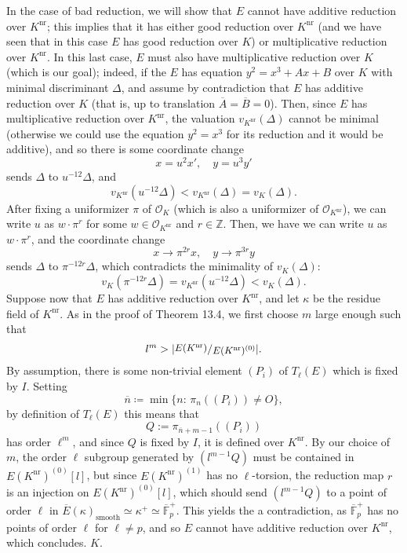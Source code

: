 \documentclass[a4paper]{article}
\newcommand{\Z}{\mathbb{Z}}
\newcommand{\Fpp}{\overline{\mathbb{F}}_p}
\newcommand{\sfrac}[2]{
        \raisebox{+0.3ex}{\scalebox{0.9}{$#1$}}
        /
        \raisebox{-0.3ex}{\scalebox{0.9}{$#2$}}
}
\theoremstyle{definition}
\theoremstyle{definition}
\theoremstyle{remark}
\theoremstyle{definition}
\begin{document}
In the case of bad reduction, we will show that $E$ cannot have additive reduction over $K^{\text{nr}}$; this implies that it has either good reduction over $K^{\text{nr}}$ (and we have seen that in
this case $E$ has good reduction over $K$) or multiplicative reduction over $K^{\text{nr}}$. In this last case, $E$ must also have multiplicative reduction over $K$ (which is our
goal); indeed, if the $E$ has equation $y^2 = x^3 + Ax + B$ over $K$ with minimal discriminant $\Delta$, and assume by contradiction that $E$ has additive reduction over $K$ (that is, up to
translation $\overline{A} = \overline{B} = 0$). Then, since $E$ has multiplicative reduction over $K^{\text{nr}}$, the valuation $v_{K^{\text{nr}}}(\Delta)$ cannot be minimal
(otherwise we could use the equation $y^2=x^3$ for its reduction and it would be additive), and so there is some coordinate change
\[
        x = u^2 x', \quad y = u^3 y'
\]
sends $\Delta$ to $u^{-12}\Delta$, and
\[
        v_{K^{\text{nr}}}(u^{-12}\Delta) < v_{K^{\text{nr}}}(\Delta)=v_K(\Delta).
\]
After fixing a uniformizer $\pi$ of
$\mathcal{O}_K$ (which is also a uniformizer of $\mathcal{O}_{K^{\text{nr}}}$), we can write $u$ as $w\cdot \pi^r$ for some $w \in \mathcal{O}_{K^{\text{nr}}}$ and $r \in \Z$. Then, we have
we can write $u$ as $w\cdot \pi^r$, and the coordinate change
\[
        x \to \pi^{2r}x, \quad y \to \pi^{3r}y
\]
sends $\Delta$ to $\pi^{-12r}\Delta$, which contradicts the minimality of $v_K(\Delta)$:
\[
        v_K(\pi^{-12r}\Delta) = v_{K^{\text{nr}}}(u^{-12}\Delta) < v_K(\Delta).
\]
Suppose now that $E$ has additive reduction over
$K^{\text{nr}}$, and let $\kappa$ be the residue field of $K^{\text{nr}}$. As in the proof of Theorem 13.4, we first choose $m$ large enough such that
$$l^m> |\sfrac{E(K^{\text{nr}})}{E(K^{\text{nr}})^{(0)}}|.$$
By assumption, there is some non-trivial element $(P_i)$ of $T_\ell(E)$ which is fixed by $I$. Setting
\[
        \overline{n}\coloneqq \min\{n:\,\pi_n((P_i))\neq O\},
\]
by definition of $T_\ell(E)$ this means that
\[Q:=\pi_{\overline{n}+m-1}((P_i))\]
has order $\ell^m$, and since $Q$ is fixed by $I$, it is defined over $K^{\text{nr}}$. By our choice of $m$, the order $\ell$ subgroup generated by $(l^{m-1}Q)$ must be contained
in $E(K^{\text{nr}})^{(0)}[l]$, but since $E(K^{\text{nr}})^{(1)}$ has no $\ell$-torsion, the reduction map $r$ is an injection on $E(K^{\text{nr}})^{(0)}[l]$, which should send
$(l^{m-1}Q)$ to a point of order $\ell$ in $\overline{E}(\kappa)_\text{smooth}\simeq \kappa^{+}\simeq \Fpp^{+}$. This yields the a contradiction, as $\Fpp^{+}$ has no points of
order $\ell$ for $\ell\neq p$, and so $E$ cannot have additive reduction over $K^{\text{nr}}$, which concludes.
$K$.
\end{document}
